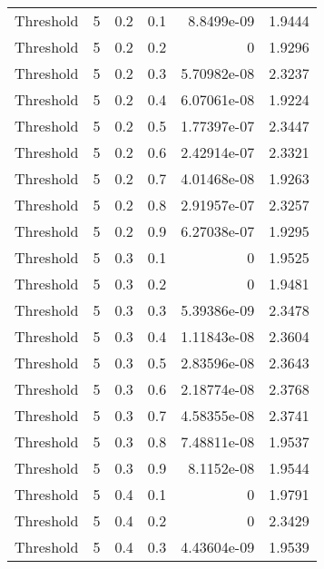 \documentclass{article}
\begin{document}
\begin{longtable}[H]{lrrrrr}
 Threshold      &       5 &   0.2 &            0.1 &   8.8499e-09  &          1.9444 \\
 Threshold      &       5 &   0.2 &            0.2 &   0           &          1.9296 \\
 Threshold      &       5 &   0.2 &            0.3 &   5.70982e-08 &          2.3237 \\
 Threshold      &       5 &   0.2 &            0.4 &   6.07061e-08 &          1.9224 \\
 Threshold      &       5 &   0.2 &            0.5 &   1.77397e-07 &          2.3447 \\
 Threshold      &       5 &   0.2 &            0.6 &   2.42914e-07 &          2.3321 \\
 Threshold      &       5 &   0.2 &            0.7 &   4.01468e-08 &          1.9263 \\
 Threshold      &       5 &   0.2 &            0.8 &   2.91957e-07 &          2.3257 \\
 Threshold      &       5 &   0.2 &            0.9 &   6.27038e-07 &          1.9295 \\
 Threshold      &       5 &   0.3 &            0.1 &   0           &          1.9525 \\
 Threshold      &       5 &   0.3 &            0.2 &   0           &          1.9481 \\
 Threshold      &       5 &   0.3 &            0.3 &   5.39386e-09 &          2.3478 \\
 Threshold      &       5 &   0.3 &            0.4 &   1.11843e-08 &          2.3604 \\
 Threshold      &       5 &   0.3 &            0.5 &   2.83596e-08 &          2.3643 \\
 Threshold      &       5 &   0.3 &            0.6 &   2.18774e-08 &          2.3768 \\
 Threshold      &       5 &   0.3 &            0.7 &   4.58355e-08 &          2.3741 \\
 Threshold      &       5 &   0.3 &            0.8 &   7.48811e-08 &          1.9537 \\
 Threshold      &       5 &   0.3 &            0.9 &   8.1152e-08  &          1.9544 \\
 Threshold      &       5 &   0.4 &            0.1 &   0           &          1.9791 \\
 Threshold      &       5 &   0.4 &            0.2 &   0           &          2.3429 \\
 Threshold      &       5 &   0.4 &            0.3 &   4.43604e-09 &          1.9539 \\

\end{longtable}
\end{document}
